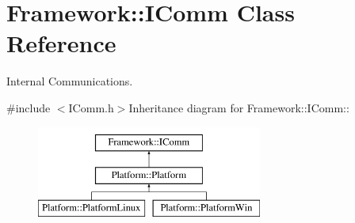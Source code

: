 \hypertarget{classFramework_1_1IComm}{
\section{Framework::IComm Class Reference}
\label{classFramework_1_1IComm}
}


Internal Communications.  


{\ttfamily \#include $<$IComm.h$>$}Inheritance diagram for Framework::IComm::\begin{figure}[H]
\begin{center}
\leavevmode
\includegraphics[height=3cm]{classFramework_1_1IComm}
\end{center}
\end{figure}
